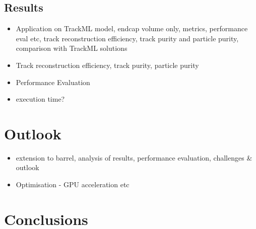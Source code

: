 \subsection{Results}
\begin{itemize}
    \item Application on TrackML model, endcap volume only, metrics, performance eval etc, track reconstruction efficiency, track purity and particle purity, comparison with TrackML solutions
    \item Track reconstruction efficiency, track purity, particle purity
    \item Performance Evaluation
    \item execution time?
\end{itemize}

\section{Outlook}
\begin{itemize}
    \item extension to barrel, analysis of results, performance  evaluation, challenges & outlook
    \item Optimisation - GPU acceleration etc
\end{itemize}


\section{Conclusions}